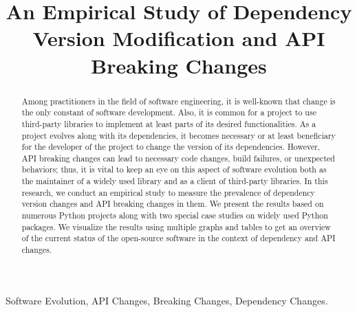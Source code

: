 \documentclass[conference]{IEEEtran}
\begin{document}
\title{An Empirical Study of Dependency Version Modification and API Breaking Changes}

\author{
}

\maketitle

\begin{abstract}
Among practitioners in the field of software engineering, it is well-known that change is the only constant of software development. Also, it is common for a project to use third-party libraries to implement at least parts of its desired functionalities. As a project evolves along with its dependencies, it becomes necessary or at least beneficiary for the developer of the project to change the version of its dependencies. However, API breaking changes can lead to necessary code changes, build failures, or unexpected behaviors; thus, it is vital to keep an eye on this aspect of software evolution both as the maintainer of a widely used library and as a client of third-party libraries. In this research, we conduct an empirical study to measure the prevalence of dependency version changes and API breaking changes in them. We present the results based on numerous Python projects along with two special case studies on widely used Python packages. We visualize the results using multiple graphs and tables to get an overview of the current status of the open-source software in the context of dependency and API changes.
\end{abstract}

\begin{IEEEkeywords}
Software Evolution, API Changes, Breaking Changes, Dependency Changes.
\end{IEEEkeywords}
\end{document}
